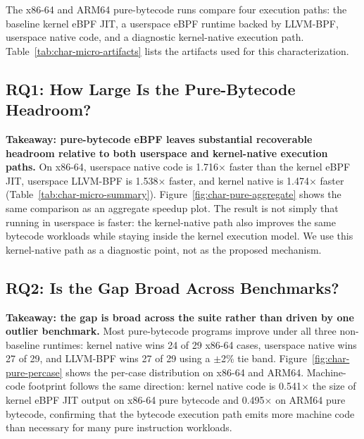 The x86-64 and ARM64 pure-bytecode runs compare four execution paths: the
baseline kernel eBPF JIT, a userspace eBPF runtime backed by LLVM-BPF,
userspace native code, and a diagnostic kernel-native execution path.
Table~\ref{tab:char-micro-artifacts} lists the artifacts used for this
characterization.



\subsection{RQ1: How Large Is the Pure-Bytecode Headroom?}
\label{subsec:char-pure-bytecode}

\noindent\textbf{Takeaway: pure-bytecode eBPF leaves substantial recoverable
headroom relative to both userspace and kernel-native execution paths.}
On x86-64, userspace native code is 1.716$\times$ faster than the kernel eBPF
JIT, userspace LLVM-BPF is 1.538$\times$ faster, and kernel native is
1.474$\times$ faster (Table~\ref{tab:char-micro-summary}). Figure~\ref{fig:char-pure-aggregate}
shows the same comparison as an aggregate speedup plot. The result is not simply
that running in userspace is faster: the kernel-native path also improves the
same bytecode workloads while staying inside the kernel execution model. We use
this kernel-native path as a diagnostic point, not as the proposed mechanism.




\subsection{RQ2: Is the Gap Broad Across Benchmarks?}
\label{subsec:char-percase}

\noindent\textbf{Takeaway: the gap is broad across the suite rather than
driven by one outlier benchmark.}
Most pure-bytecode programs improve under all three non-baseline runtimes:
kernel native wins 24 of 29 x86-64 cases, userspace native wins 27 of 29, and
LLVM-BPF wins 27 of 29 using a $\pm$2\% tie band. Figure~\ref{fig:char-pure-percase}
shows the per-case distribution on x86-64 and ARM64. Machine-code footprint
follows the same direction: kernel native code is 0.541$\times$ the size of
kernel eBPF JIT output on x86-64 pure bytecode and 0.495$\times$ on ARM64 pure
bytecode, confirming that the bytecode execution path emits more machine code
than necessary for many pure instruction workloads.

